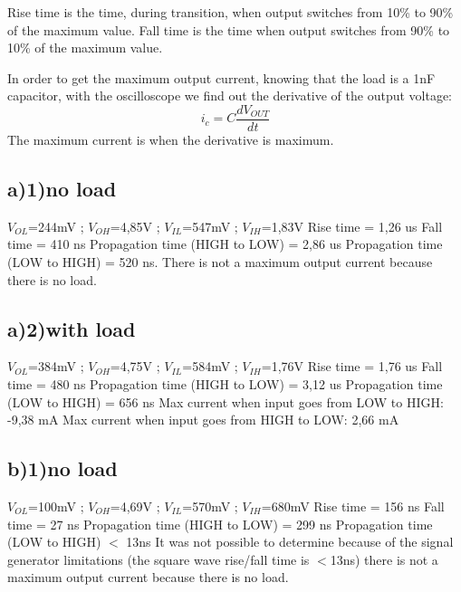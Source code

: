  Rise time is the time, during transition, when output switches from 10\% to 90\% of the maximum value.
Fall time is the time when output switches from 90\% to 10\% of the maximum value.

In order to get the maximum output current, knowing that the
 load is a 1nF capacitor, with the oscilloscope we find out
  the derivative of the output voltage:
\begin{equation}
    i_{c}=C\frac{dV_{OUT}}{dt}
\end{equation}
The maximum current is when the derivative is maximum.
\subsection*{a)1)no load}
$V_{OL}$=244mV ;
$V_{OH}$=4,85V ; 
$V_{IL}$=547mV ;
$V_{IH}$=1,83V
\newline
Rise time = 1,26 us 
\newline
Fall time = 410 ns 
\newline 
Propagation time (HIGH to LOW) = 2,86 us 
\newline
Propagation time (LOW to HIGH) = 520 ns.
\newline
There is not a maximum output current because there is no load.

\subsection*{a)2)with load} 

$V_{OL}$=384mV ; 
$V_{OH}$=4,75V ; 
$V_{IL}$=584mV ;
$V_{IH}$=1,76V 
\newline
Rise time = 1,76 us
\newline
Fall time = 480 ns
\newline
Propagation time (HIGH to LOW) = 3,12 us
\newline
Propagation time (LOW to HIGH) = 656 ns
\newline
Max current when input goes from LOW to HIGH: -9,38 mA
\newline
Max current when input goes from HIGH to LOW: 2,66 mA
\subsection*{b)1)no load}
$V_{OL}$=100mV ; 
$V_{OH}$=4,69V ; 
$V_{IL}$=570mV ; 
$V_{IH}$=680mV 
\newline
Rise time = 156 ns
\newline
Fall time = 27 ns
\newline
Propagation time (HIGH to LOW) = 299 ns
\newline
Propagation time (LOW to HIGH) $<$ 13ns
\newline
It was not possible to determine because of the signal generator limitations
(the square wave rise/fall time is $<$13ns)
there is not a maximum output current because there is no load. 


